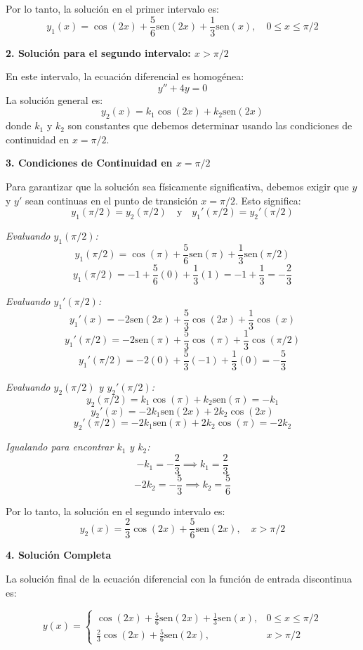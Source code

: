 \documentclass[a4paper]{article}
\begin{document}
Por lo tanto, la solución en el primer intervalo es:
$$
y_1(x) = \cos(2x) + \frac{5}{6} \text{sen}(2x) + \frac{1}{3} \text{sen}(x), \quad 0 \leq x \leq \pi/2
$$

\textbf{2. Solución para el segundo intervalo: $x > \pi/2$}

En este intervalo, la ecuación diferencial es homogénea:
$$
y'' + 4y = 0
$$
La solución general es:
$$
y_2(x) = k_1 \cos(2x) + k_2 \text{sen}(2x)
$$
donde $k_1$ y $k_2$ son constantes que debemos determinar usando las condiciones de continuidad en $x = \pi/2$.

\textbf{3. Condiciones de Continuidad en $x = \pi/2$}

Para garantizar que la solución sea físicamente significativa, debemos exigir que $y$ y $y'$ sean continuas en el punto de transición $x = \pi/2$. Esto significa:
$$
y_1(\pi/2) = y_2(\pi/2) \quad \text{y} \quad y_1'(\pi/2) = y_2'(\pi/2)
$$

\textit{Evaluando $y_1(\pi/2)$:}
$$
y_1(\pi/2) = \cos(\pi) + \frac{5}{6} \text{sen}(\pi) + \frac{1}{3} \text{sen}(\pi/2)
$$
$$
y_1(\pi/2) = -1 + \frac{5}{6}(0) + \frac{1}{3}(1) = -1 + \frac{1}{3} = -\frac{2}{3}
$$

\textit{Evaluando $y_1'(\pi/2)$:}
$$
y_1'(x) = -2 \text{sen}(2x) + \frac{5}{3} \cos(2x) + \frac{1}{3} \cos(x)
$$
$$
y_1'(\pi/2) = -2 \text{sen}(\pi) + \frac{5}{3} \cos(\pi) + \frac{1}{3} \cos(\pi/2)
$$
$$
y_1'(\pi/2) = -2(0) + \frac{5}{3}(-1) + \frac{1}{3}(0) = -\frac{5}{3}
$$

\textit{Evaluando $y_2(\pi/2)$ y $y_2'(\pi/2)$:}
$$
y_2(\pi/2) = k_1 \cos(\pi) + k_2 \text{sen}(\pi) = -k_1
$$
$$
y_2'(x) = -2k_1 \text{sen}(2x) + 2k_2 \cos(2x)
$$
$$
y_2'(\pi/2) = -2k_1 \text{sen}(\pi) + 2k_2 \cos(\pi) = -2k_2
$$

\textit{Igualando para encontrar $k_1$ y $k_2$:}
$$
-k_1 = -\frac{2}{3} \implies k_1 = \frac{2}{3}
$$
$$
-2k_2 = -\frac{5}{3} \implies k_2 = \frac{5}{6}
$$

Por lo tanto, la solución en el segundo intervalo es:
$$
y_2(x) = \frac{2}{3} \cos(2x) + \frac{5}{6} \text{sen}(2x), \quad x > \pi/2
$$

\textbf{4. Solución Completa}

La solución final de la ecuación diferencial con la función de entrada discontinua es:

$$
y(x) = \begin{cases} 
\displaystyle \cos(2x) + \frac{5}{6} \text{sen}(2x) + \frac{1}{3} \text{sen}(x), & 0 \leq x \leq \pi/2 \\[10pt]
\displaystyle \frac{2}{3} \cos(2x) + \frac{5}{6} \text{sen}(2x), & x > \pi/2 
\end{cases}
$$
\end{document}
